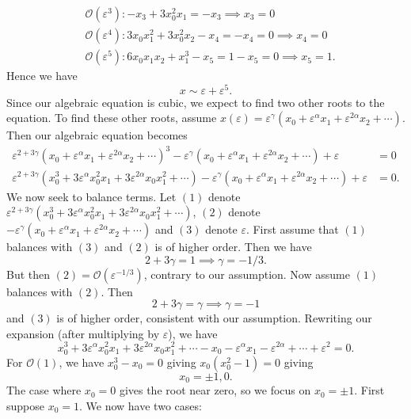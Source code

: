 \documentclass{article}
\begin{document}
\begin{itemize}
\begin{itemize}
\begin{align*}
            &\mathcal{O}(\varepsilon^3): -x_3 + 3x_0^2x_1 = -x_3 \implies x_3 = 0\\
            &\mathcal{O}(\varepsilon^4): 3x_0x_1^2 + 3x_0^2x_2 - x_4 = -x_4 = 0 \implies x_4 = 0\\
            &\mathcal{O}(\varepsilon^5): 6x_0x_1x_2 + x_1^3 - x_5 = 1 - x_5 = 0 \implies x_5 = 1.
        \end{align*}
        Hence we have
        \[x \sim \varepsilon + \varepsilon^5.\]
        Since our algebraic equation is cubic, we expect to find two other roots to the equation. To find these other roots, assume $x(\varepsilon) = \varepsilon^{\gamma}(x_0 + \varepsilon^{\alpha}x_1 + \varepsilon^{2\alpha}x_2 + \cdots)$. Then our algebraic equation becomes
        \begin{align*}
            \varepsilon^{2 + 3\gamma}(x_0 + \varepsilon^{\alpha}x_1 + \varepsilon^{2\alpha}x_2 + \cdots)^3 - \varepsilon^{\gamma}(x_0 + \varepsilon^{\alpha}x_1 + \varepsilon^{2\alpha}x_2 + \cdots) + \varepsilon &= 0\\
            \varepsilon^{2 + 3\gamma}(x_0^3 + 3\varepsilon^{\alpha}x_0^2x_1 + 3\varepsilon^{2\alpha}x_0x_1^2 + \cdots) - \varepsilon^{\gamma}(x_0 + \varepsilon^{\alpha}x_1 + \varepsilon^{2\alpha}x_2 + \cdots) + \varepsilon &= 0.
        \end{align*}
        We now seek to balance terms. Let $(1)$ denote $\varepsilon^{2 + 3\gamma}(x_0^3 + 3\varepsilon^{\alpha}x_0^2x_1 + 3\varepsilon^{2\alpha}x_0x_1^2 + \cdots)$, $(2)$ denote $-\varepsilon^{\gamma}(x_0 + \varepsilon^{\alpha}x_1 + \varepsilon^{2\alpha}x_2 + \cdots)$ and $(3)$ denote $\varepsilon$. First assume that $(1)$ balances with $(3)$ and $(2)$ is of higher order. Then we have $$2 + 3\gamma = 1 \implies \gamma = -1/3.$$ But then $(2) = \mathcal{O}(\varepsilon^{-1/3})$, contrary to our assumption. Now assume $(1)$ balances with $(2)$. Then $$2 + 3\gamma = \gamma \implies \gamma = -1$$ and $(3)$ is of higher order, consistent with our assumption. Rewriting our expansion (after multiplying by $\varepsilon$), we have
        \[x_0^3 + 3\varepsilon^{\alpha}x_0^2x_1 + 3\varepsilon^{2\alpha}x_0x_1^2 + \cdots - x_0 - \varepsilon^{\alpha}x_1 - \varepsilon^{2\alpha} + \cdots + \varepsilon^2 = 0.\]
        For $\mathcal{O}(1)$, we have $x_0^3 - x_0 = 0$ giving $x_0(x_0^2 - 1) = 0$ giving 
        \[x_0 = \pm 1, 0.\]
        The case where $x_0 = 0$ gives the root near zero, so we focus on $x_0 = \pm 1$. First suppose $x_0 = 1$. We now have two cases:
        \newline\newline

\end{itemize}
\end{itemize}
\end{document}
